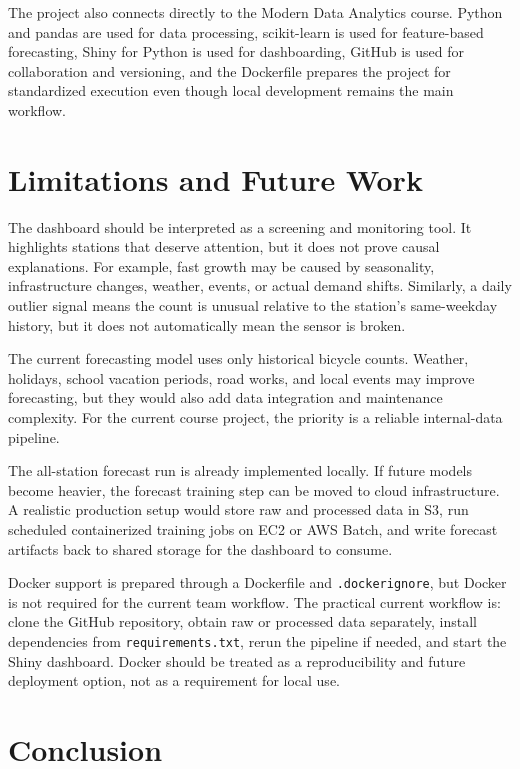 \documentclass[11pt]{article}
\newcommand{\code}[1]{\texttt{#1}}
\begin{document}
The project also connects directly to the Modern Data Analytics course. Python and pandas are used for data processing, scikit-learn is used for feature-based forecasting, Shiny for Python is used for dashboarding, GitHub is used for collaboration and versioning, and the Dockerfile prepares the project for standardized execution even though local development remains the main workflow.

\section{Limitations and Future Work}

The dashboard should be interpreted as a screening and monitoring tool. It highlights stations that deserve attention, but it does not prove causal explanations. For example, fast growth may be caused by seasonality, infrastructure changes, weather, events, or actual demand shifts. Similarly, a daily outlier signal means the count is unusual relative to the station's same-weekday history, but it does not automatically mean the sensor is broken.

The current forecasting model uses only historical bicycle counts. Weather, holidays, school vacation periods, road works, and local events may improve forecasting, but they would also add data integration and maintenance complexity. For the current course project, the priority is a reliable internal-data pipeline.

The all-station forecast run is already implemented locally. If future models become heavier, the forecast training step can be moved to cloud infrastructure. A realistic production setup would store raw and processed data in S3, run scheduled containerized training jobs on EC2 or AWS Batch, and write forecast artifacts back to shared storage for the dashboard to consume.

Docker support is prepared through a Dockerfile and \code{.dockerignore}, but Docker is not required for the current team workflow. The practical current workflow is: clone the GitHub repository, obtain raw or processed data separately, install dependencies from \code{requirements.txt}, rerun the pipeline if needed, and start the Shiny dashboard. Docker should be treated as a reproducibility and future deployment option, not as a requirement for local use.

\section{Conclusion}
\end{document}
